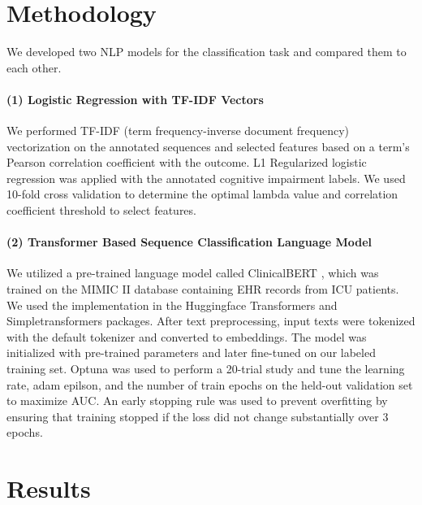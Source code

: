 \documentclass[pmlr,twocolumn,10pt]{jmlr} %
\begin{document}
\section{Methodology}

We developed two NLP models for the classification task and compared them to each other.

\label{sec:TFIDF}  
\paragraph{(1) Logistic Regression with TF-IDF Vectors} We performed TF-IDF (term frequency-inverse document frequency) vectorization on the annotated sequences and selected features based on a term's Pearson correlation coefficient with the outcome. L1 Regularized logistic regression \citep{tibshirani1996regression} was applied with the annotated cognitive impairment labels. We used 10-fold cross validation to determine the optimal lambda value and correlation coefficient threshold to select features. 

\label{sec:Transformer}  
\paragraph{(2) Transformer Based Sequence Classification Language Model} We utilized a pre-trained language model called ClinicalBERT \citep{alsentzer2019publicly}, which was trained on the MIMIC II \citep{saeed2011multiparameter} database containing EHR records from ICU patients. We used the implementation in the Huggingface Transformers \citep{Wolf2019HuggingFacesTS} and Simpletransformers \citep{simple2020thilina} packages. After text preprocessing, input texts were tokenized with the default tokenizer and converted to embeddings. The model was initialized with pre-trained parameters and later fine-tuned on our labeled training set. Optuna \citep{akiba2019optuna} was used to perform a 20-trial study and tune the learning rate, adam epilson, and the number of train epochs on the held-out validation set to maximize AUC. An early stopping rule was used to prevent overfitting by ensuring that training stopped if the loss did not change substantially over 3 epochs.

\section{Results}
\label{sec:Results}  

\end{document}
